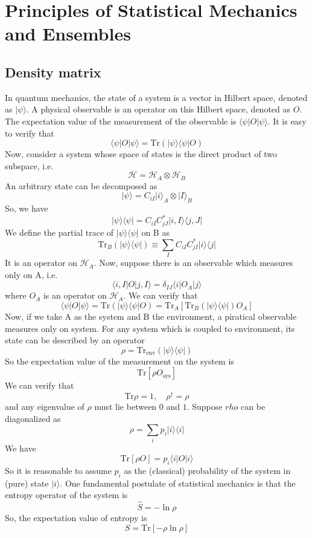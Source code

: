 \chapter{Principles of Statistical Mechanics and Ensembles}
\section{Density matrix}
In quantum mechanics, the state of a system is a vector in Hilbert space, denoted as $|\psi\rangle$. A physical observable is an operator on this Hilbert space, denoted as $O$. The expectation value of the measurement of the observable is $\langle \psi | O | \psi \rangle$. It is easy to verify that
\[\langle \psi | O | \psi \rangle = \mathrm{Tr}(| \psi \rangle \langle \psi | O)\]
Now, consider a system whose space of states is the direct product of two subspace, i.e.
\[\mathcal{H} = \mathcal{H}_A \otimes \mathcal{H}_B\]
An arbitrary state can be decomposed as
\[|\psi\rangle = C_{iI}|i\rangle_A \otimes |I\rangle_B\]
So, we have
\[| \psi \rangle \langle \psi | = C_{iI}C^*_{jJ} |i,I\rangle \langle j,J |\]
We define the partial trace of $| \psi \rangle \langle \psi |$ on B as
\[\mathrm{Tr}_B (| \psi \rangle \langle \psi |) \equiv \sum_{I} C_{iI}C^*_{jI} |i\rangle \langle j |\]
It is an operator on $\mathcal{H}_A$. 
Now, suppose there is an observable which measures only on A, i.e.
\[\langle i,I | O | j,I \rangle = \delta_{IJ} \langle i | O_A | j \rangle\]
where $O_A$ is an operator on $\mathcal{H}_A$. We can verify that
\[\langle \psi | O | \psi \rangle = \mathrm{Tr}(| \psi \rangle \langle \psi | O) = \mathrm{Tr}_A \left[\mathrm{Tr}_B (| \psi \rangle \langle \psi |) O_A   \right]\]
Now, if we take A as the system and B the environment, a piratical observable measures only on system. For any system which is coupled to environment, its state can be described by an operator
\[\rho = \mathrm{Tr}_{\mathrm{env}} (| \psi \rangle \langle \psi |)\]
So the expectation value of the measurement on the system is
\[\mathrm{Tr}[\rho O_{\mathrm{sys}}]\]
We can verify that
\[\mathrm{Tr}\rho = 1 ,\quad \rho^{\dagger} = \rho\]
and any eigenvalue of $\rho$ must lie between $0$ and $1$. 
Suppose $rho$ can be diagonalized as
\[\rho = \sum_i p_i |i\rangle\langle i |\]
We have
\[\mathrm{Tr}[\rho O] = p_i \langle i | O | i \rangle\]
So it is reasonable to assume $p_i$ as the (classical) probability of the system in (pure) state $|i\rangle$.
One fundamental postulate of statistical mechanics is that the entropy operator of the system is
\[\hat{S} = -\ln \rho\]
So, the expectation value of entropy is
\[S = \mathrm{Tr}[-\rho\ln\rho]\]

